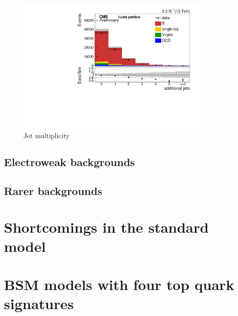 \begin{figure}[ht!]
\begin{center}
    \includegraphics[width=0.85\textwidth]{images/Theory/ttbarAdd.pdf}
    \caption{Jet multiplicity }
    \label{fig:ttbarAdd}
\end{center}
\end{figure}

\subsection{Electroweak backgrounds}

\subsection{Rarer backgrounds}

\section{Shortcomings in the standard model}

\section{BSM models with four top quark signatures}



